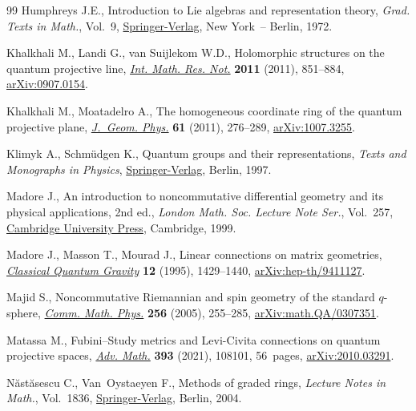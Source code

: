 \documentclass[10pt,a4paper]{amsart}
\numberwithin{equation}{section}
\begin{document}
\begin{thebibliography}{99}
Humphreys J.E., Introduction to {L}ie algebras and representation theory,
 \textit{Grad. Texts in Math.}, Vol.~9, \href{https://doi.org/10.1007/978-1-4612-6398-2}{Springer-Verlag}, New York~-- Berlin,
 1972.

Khalkhali M., Landi G., van Suijlekom W.D., Holomorphic structures on the
 quantum projective line, \href{https://doi.org/10.1093/imrn/rnq097}{\textit{Int. Math. Res. Not.}} \textbf{2011} (2011),
 851--884, \href{https://arxiv.org/abs/0907.0154}{arXiv:0907.0154}.

Khalkhali M., Moatadelro A., The homogeneous coordinate ring of the quantum
 projective plane, \href{https://doi.org/10.1016/j.geomphys.2010.09.014}{\textit{J.~Geom. Phys.}} \textbf{61} (2011), 276--289,
 \href{https://arxiv.org/abs/1007.3255}{arXiv:1007.3255}.

Klimyk A., Schm\"{u}dgen K., Quantum groups and their representations, \textit{Texts
 and Monographs in Physics}, \href{https://doi.org/10.1007/978-3-642-60896-4}{Springer-Verlag}, Berlin, 1997.

Madore J., An introduction to noncommutative differential geometry and its
 physical applications, 2nd ed., \textit{London Math. Soc. Lecture Note Ser.}, Vol.~257, \href{https://doi.org/10.1017/CBO9780511569357}{Cambridge University Press}, Cambridge, 1999.

Madore J., Masson T., Mourad J., Linear connections on matrix geometries,
 \href{https://doi.org/10.1088/0264-9381/12/6/009}{\textit{Classical Quantum Gravity}} \textbf{12} (1995), 1429--1440,
 \href{https://arxiv.org/abs/hep-th/9411127}{arXiv:hep-th/9411127}.

Majid S., Noncommutative {R}iemannian and spin geometry of the standard
 {$q$}-sphere, \href{https://doi.org/10.1007/s00220-005-1295-8}{\textit{Comm. Math. Phys.}} \textbf{256} (2005), 255--285,
 \href{https://arxiv.org/abs/math.QA/0307351}{arXiv:math.QA/0307351}.

Matassa M., Fubini--{S}tudy metrics and {L}evi-{C}ivita connections on quantum
 projective spaces, \href{https://doi.org/10.1016/j.aim.2021.108101}{\textit{Adv. Math.}} \textbf{393} (2021), 108101, 56~pages,
 \href{https://arxiv.org/abs/2010.03291}{arXiv:2010.03291}.

N\u{a}st\u{a}sescu C., Van~Oystaeyen F., Methods of graded rings,
 \textit{Lecture Notes in Math.}, Vol.~1836, \href{https://doi.org/10.1007/b94904}{Springer-Verlag}, Berlin, 2004.


\end{thebibliography}
\end{document}
